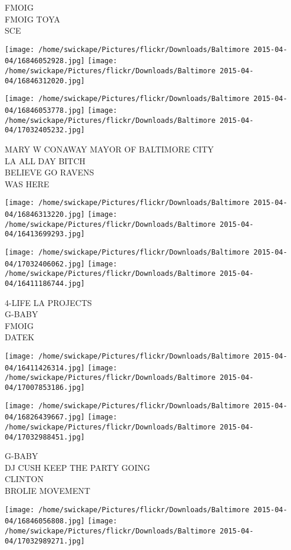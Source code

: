 \documentclass[10pt,letterpaper]{article}
\begin{document}
FMOIG\\
FMOIG TOYA\\
SCE
\pagebreak

\texttt{[image: /home/swickape/Pictures/flickr/Downloads/Baltimore 2015-04-04/16846052928.jpg]}
\texttt{[image: /home/swickape/Pictures/flickr/Downloads/Baltimore 2015-04-04/16846312020.jpg]}

\texttt{[image: /home/swickape/Pictures/flickr/Downloads/Baltimore 2015-04-04/16846053778.jpg]}
\texttt{[image: /home/swickape/Pictures/flickr/Downloads/Baltimore 2015-04-04/17032405232.jpg]}

MARY W CONAWAY MAYOR OF BALTIMORE CITY\\
LA ALL DAY BITCH\\
BELIEVE GO RAVENS\\
WAS HERE
\pagebreak

\texttt{[image: /home/swickape/Pictures/flickr/Downloads/Baltimore 2015-04-04/16846313220.jpg]}
\texttt{[image: /home/swickape/Pictures/flickr/Downloads/Baltimore 2015-04-04/16413699293.jpg]}

\texttt{[image: /home/swickape/Pictures/flickr/Downloads/Baltimore 2015-04-04/17032406062.jpg]}
\texttt{[image: /home/swickape/Pictures/flickr/Downloads/Baltimore 2015-04-04/16411186744.jpg]}

4{-}LIFE LA PROJECTS\\
G{-}BABY\\
FMOIG\\
DATEK
\pagebreak

\texttt{[image: /home/swickape/Pictures/flickr/Downloads/Baltimore 2015-04-04/16411426314.jpg]}
\texttt{[image: /home/swickape/Pictures/flickr/Downloads/Baltimore 2015-04-04/17007853186.jpg]}

\texttt{[image: /home/swickape/Pictures/flickr/Downloads/Baltimore 2015-04-04/16826439667.jpg]}
\texttt{[image: /home/swickape/Pictures/flickr/Downloads/Baltimore 2015-04-04/17032988451.jpg]}

G{-}BABY\\
DJ CUSH KEEP THE PARTY GOING\\
CLINTON\\
BROLIE MOVEMENT
\pagebreak

\texttt{[image: /home/swickape/Pictures/flickr/Downloads/Baltimore 2015-04-04/16846056808.jpg]}
\texttt{[image: /home/swickape/Pictures/flickr/Downloads/Baltimore 2015-04-04/17032989271.jpg]}
\end{document}
